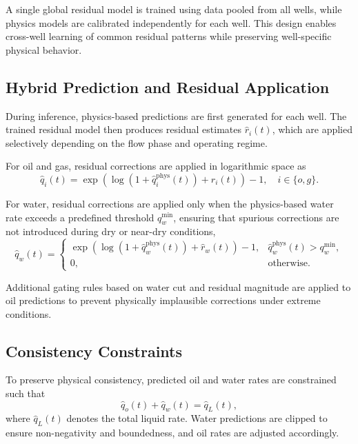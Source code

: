 \documentclass[12pt,APA]{uomthesis}
\begin{document}
A single global residual model is trained using data pooled from all wells, while physics models are calibrated independently for each well. This design enables cross-well learning of common residual patterns while preserving well-specific physical behavior.

\subsection{Hybrid Prediction and Residual Application}
During inference, physics-based predictions are first generated for each well. The trained residual model then produces residual estimates $\hat{r}_i(t)$, which are applied selectively depending on the flow phase and operating regime.

For oil and gas, residual corrections are applied in logarithmic space as
\begin{equation}
\hat{q}_i(t) =
\exp\!\left(
\log\!\left(1 + \hat{q}_i^{\text{phys}}(t)\right) + \hat{r}_i(t)
\right) - 1,
\quad i \in \{o, g\}.
\end{equation}

For water, residual corrections are applied only when the physics-based water rate exceeds a predefined threshold $q_w^{\text{min}}$, ensuring that spurious corrections are not introduced during dry or near-dry conditions,
\begin{equation}
\hat{q}_w(t) =
\begin{cases}
\exp\!\left(
\log\!\left(1 + \hat{q}_w^{\text{phys}}(t)\right) + \hat{r}_w(t)
\right) - 1, & \hat{q}_w^{\text{phys}}(t) > q_w^{\text{min}}, \\
0, & \text{otherwise}.
\end{cases}
\end{equation}

Additional gating rules based on water cut and residual magnitude are applied to oil predictions to prevent physically implausible corrections under extreme conditions.

\subsection{Consistency Constraints}
To preserve physical consistency, predicted oil and water rates are constrained such that
\begin{equation}
\hat{q}_o(t) + \hat{q}_w(t) = \hat{q}_L(t),
\end{equation}
where $\hat{q}_L(t)$ denotes the total liquid rate. Water predictions are clipped to ensure non-negativity and boundedness, and oil rates are adjusted accordingly.
\end{document}
